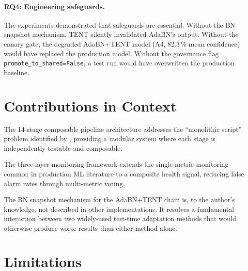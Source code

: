 \paragraph{RQ4: Engineering safeguards.}
The experiments demonstrated that safeguards are essential.
Without the BN snapshot mechanism, TENT silently invalidated AdaBN's output.
Without the canary gate, the degraded AdaBN+TENT model (A4, 82.3\,\% mean
confidence) would have replaced the production model.
Without the governance flag \texttt{promote\_to\_shared=False}, a test run
would have overwritten the production baseline.

\section{Contributions in Context}
\label{sec:contributions_context}

The 14-stage composable pipeline architecture addresses the ``monolithic script''
problem identified by \citet{sculley2015hidden}, providing a modular system
where each stage is independently testable and composable.

The three-layer monitoring framework extends the single-metric monitoring
common in production ML literature to a composite health signal, reducing
false alarm rates through multi-metric voting.

The BN snapshot mechanism for the AdaBN+TENT chain is, to the author's
knowledge, not described in other implementations.
It resolves a fundamental interaction between two widely-used test-time
adaptation methods that would otherwise produce worse results than either
method alone.

\section{Limitations}
\label{sec:limitations}

